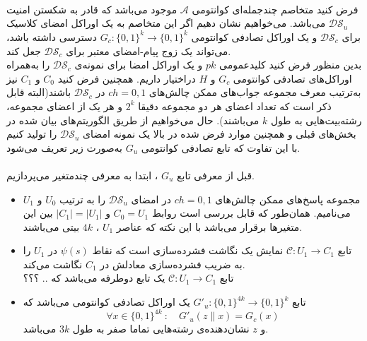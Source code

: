 \\
\\
\\
فرض کنید متخاصم چندجمله‌ای کوانتومی
$\mathcal{A}$
موجود می‌باشد که قادر به شکستن امنیت
$\mathcal{DS}_u$
می‌باشد.
می‌خواهیم نشان دهیم اگر این متخاصم به  یک اوراکل امضای کلاسیک برای 
$\mathcal{DS}_c$
و یک اوراکل تصادفی کوانتومی 
$G_c : \{ 0,1 \}^k \rightarrow \{ 0,1\}^k$
دسترسی داشته باشد، می‌تواند
یک زوج پیام-امضای معتبر برای 
$\mathcal{DS}_c$
جعل کند.
\\
بدین منظور فرض کنید کلیدعمومی
$pk$
 و یک اوراکل امضا برای نمونه‌ی
$\mathcal{DS}_c$
 را به‌همراه اوراکل‌های تصادفی کوانتومی
$G_c$
و
$H$
دراختیار داریم. همچنین فرض کنید 
$C_0$
و
$C_1$
نیز به‌ترتیب معرف مجموعه جواب‌های ممکن چالش‌های
$ch=0,1$
در  
$\mathcal{DS}_c$
باشند(البته قابل ذکر است که تعداد اعضای هر دو مجموعه دقیقا
$2^k$ 
و هر یک از اعضای مجموعه، رشته‌بیت‌هایی به طول
$k$
می‌باشند). 
حال می‌خواهیم از طریق الگوریتم‌های بیان شده در بخش‌های قبلی و همچنین موارد فرض شده در بالا  یک نمونه امضای 
$\mathcal{DS}_u$
را تولید کنیم با این تفاوت که تابع تصادفی کوانتومی 
$G_u$
به‌صورت زیر تعریف می‌شود.
\\
\\
قبل از معرفی تابع 
$G_u$
، ابتدا به معرفی چندمتغیر می‌پردازیم.
\begin{itemize}
\item {
مجموعه پاسخ‌های ممکن چالش‌های
$ch=0,1$
در امضای
$\mathcal{DS}_u$
را به ‌ترتیب 
$U_0$
و
$U_1$
می‌نامیم. همان‌طور که قابل بررسی است روابط
$C_0 = U_1$
و
$|C_1| = |U_1|$
بین این متغیرها برقرار می‌باشد با این نکته که عناصر 
$U_1$
، 
$4k$
بیتی می‌باشند.
}

\item {
تابع 
$\mathcal{C} : U_1 \rightarrow C_1$
نمایش یک نگاشت فشرده‌سازی است که نقاط
$\psi(s)$
در
$U_1$
 را به ضریب فشرده‌سازی معادلش در
$C_1$
نگاشت می‌کند.
\\
تابع
$\mathcal{C} : U_1 \rightarrow C_1$
یک تابع دوطرفه می‌باشد که .. ؟؟؟
}

\item {
تابع
$G'_u : \{0,1\}^{4k} \rightarrow \{0,1\}^k$
یک اوراکل تصادفی کوانتومی می‌باشد که 
$$ \forall x \in \{0,1\}^{4k}~: \quad G'_u(z \parallel x) = G_c(x)  $$
و 
$z$
نشان‌دهنده‌ی رشته‌هایی تماما صفر به‌ طول
$3k$
می‌باشد.
}
\end{itemize}~

